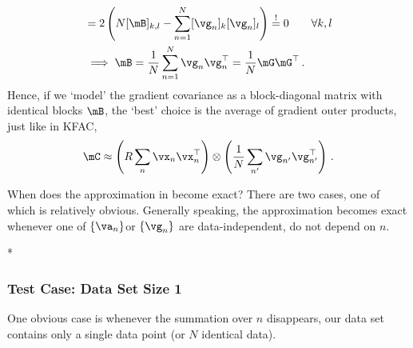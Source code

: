 \begin{example}
\begin{align*}
    &=
      2 \left( N[\mB]_{k,l} - \sum_{n=1}^N [\vg_n]_k [\vg_n]_l \right)
      \stackrel{!}{=} 0 \qquad\forall k,l
    \\
    &\implies
      \mB = \frac{1}{N} \sum_{n=1}^N \vg_n \vg_n^{\top}
      = \frac{1}{N} \mG \mG^{\top}\,.
  \end{align*}
  Hence, if we `model' the gradient covariance as a block-diagonal matrix with identical blocks $\mB$, the `best' choice is the average of gradient outer products, just like in KFAC,
  \begin{align*}
    \mC
    \approx
    \left(R \sum_n \vx_n \vx_n^\top \right)
    \otimes
    \left(\frac{1}{N} \sum_{n'} \vg_{n'} \vg_{n'}^\top \right)\,.
  \end{align*}
\end{example}

When does the approximation in  become exact?
There are two cases, one of which is relatively obvious.
Generally speaking, the approximation becomes exact whenever one of $\{\va_n\}$or $\{\vg_n\}$ are data-independent, \ie do not depend on $n$.


\switchcolumn[1]*
\switchcolumn[0]

\subsubsection{Test Case: Data Set Size 1}
One obvious case is whenever the summation over $n$ disappears, \ie our data set contains only a single data point (or $N$ identical data).

